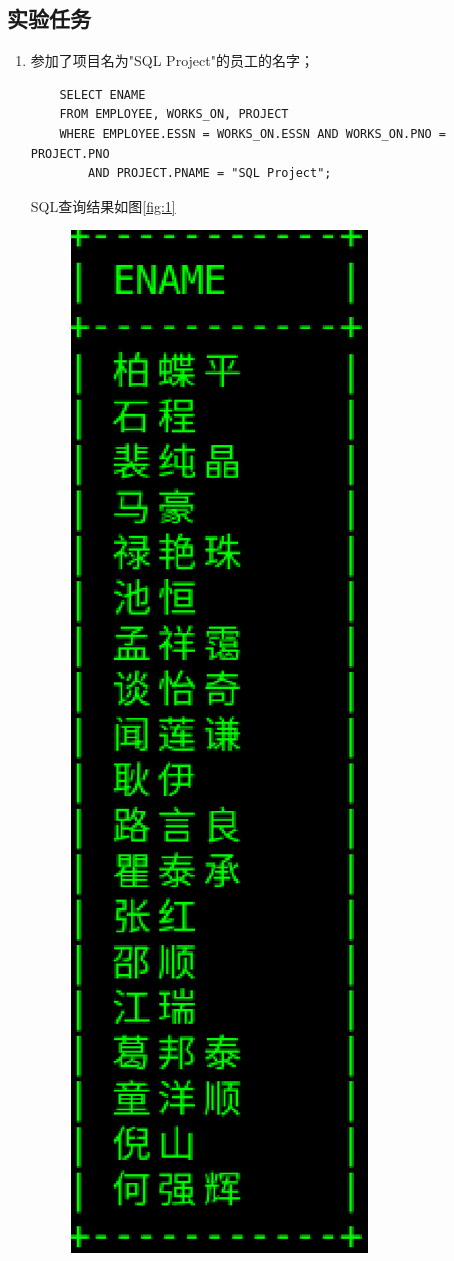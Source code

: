\documentclass{ML}
\begin{document}
\subsection{实验任务}
\begin{enumerate}
    \item 参加了项目名为"SQL Project"的员工的名字；
    \begin{verbatim}
    SELECT ENAME
    FROM EMPLOYEE, WORKS_ON, PROJECT
    WHERE EMPLOYEE.ESSN = WORKS_ON.ESSN AND WORKS_ON.PNO = PROJECT.PNO
        AND PROJECT.PNAME = "SQL Project";
    \end{verbatim}
    SQL查询结果如图\ref{fig:1}
    \begin{figure}[htb]
        \centering
        \includegraphics[scale=0.4, bb=0 0 148 495]{media/3.1.1.eps}

\end{figure}
\end{enumerate}
\end{document}
